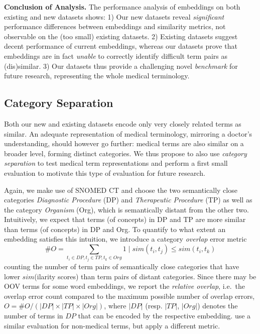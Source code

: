 \documentclass[letterpaper]{article} %
\begin{document}
\noindent\textbf{Conclusion of Analysis.}
The performance analysis of embeddings on both existing and new datasets shows:
1) Our new datasets reveal \emph{significant} performance differences between embeddings and similarity metrics, not observable on the (too small) existing datasets.
2) Existing datasets suggest decent performance of current embeddings, whereas our datasets prove that embeddings are in fact \emph{unable} to correctly identify difficult term pairs as (dis)similar.
3) Our datasets thus provide a challenging novel \emph{benchmark} for future research, representing the whole medical terminology.


\subsection{Category Separation}
Both our new and existing datasets encode only very closely related terms as similar.
An adequate representation of medical terminology, mirroring a doctor's understanding, should however go further: medical terms are also similar on a broader level, forming distinct categories.
We thus propose to also use \emph{category separation} to test medical term representations and perform a first small evaluation to motivate this type of evaluation for future research.

Again, we make use of SNOMED CT and choose the two semantically close categories
\emph{Diagnostic Procedure} (DP) and \emph{Therapeutic Procedure} (TP) as well as the category \emph{Organism} (Org), which is semantically distant from the other two. 
Intuitively, we expect that terms (of concepts) in DP and TP are more similar than terms (of concepts) in DP and Org. 
To quantify to what extent an embedding satisfies this intuition, we introduce a category \emph{overlap} error metric
\[\#O = \sum_{t_i \in DP, t_j \in TP, t_k \in Org} 1 \mid sim(t_i, t_j) \leq sim(t_i,t_k)\]
counting the number of term pairs of semantically close categories that have lower $sim$(ilarity scores) than term pairs of distant categories. 
Since there may be OOV terms for some word embeddings, we report the \emph{relative overlap}, i.e.~the overlap error count compared to the maximum possible number of overlap errors,
$O = \#O  / (|DP| \times |TP| \times |Org|)$, where $|DP|$ (resp. $|TP|$, $|Org|$) denotes the number of terms in $DP$ that can be encoded by the respective embedding.
\citeauthor{DBLP:journals/corr/abs-1803-04488}  use
a similar evaluation for non-medical terms, but apply a different metric. 
\end{document}
